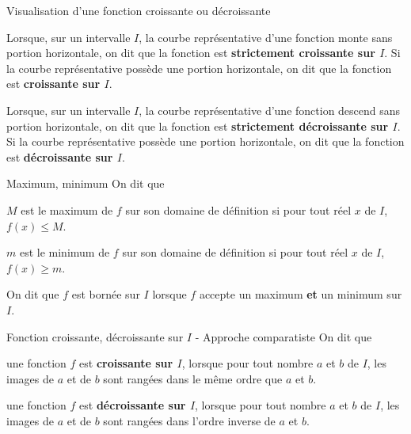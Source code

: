 \begin{DefT}{Visualisation d'une fonction croissante ou décroissante}
\begin{description}[leftmargin=*]
\item[•] Lorsque, sur un intervalle $I$, la courbe représentative d'une fonction monte sans portion horizontale, on dit que la fonction est \textbf{strictement croissante sur $I$}. Si la courbe représentative possède une portion horizontale, on dit que la fonction est \textbf{croissante sur $I$}.
\item[•] Lorsque, sur un intervalle $I$, la courbe représentative d'une fonction descend sans portion horizontale, on dit que la fonction est \textbf{strictement décroissante sur $I$}. Si la courbe représentative possède une portion horizontale, on dit que la fonction est \textbf{décroissante sur $I$}.
\end{description}
\end{DefT}




\begin{DefT}{Maximum, minimum}
On dit que
\begin{description}[leftmargin=*]
\item[•] $M$ est le maximum de $f$ sur son domaine de définition si pour tout réel $x$ de $I$, $f(x) \leq M$. 
\item[•] $m$ est le minimum de $f$ sur son domaine de définition si pour tout réel $x$ de $I$, $f(x) \geq m$. 
\end{description} 
On dit que $f$ est bornée  sur $I$ lorsque $f$ accepte un maximum \textbf{et} un minimum sur $I$.
\end{DefT}



\begin{DefT}{Fonction croissante, décroissante sur $I$ - Approche comparatiste}
On dit que
\begin{description}[leftmargin=*]
\item[•] une fonction $f$ est \textbf{croissante sur $I$}, lorsque pour tout nombre $a$ et $b$ de $I$, les images de $a$ et de $b$ sont rangées dans le même ordre que $a$ et $b$.
\item[•] une fonction $f$ est \textbf{décroissante sur $I$}, lorsque pour tout nombre $a$ et $b$ de $I$,  les images de $a$ et de $b$ sont rangées dans l'ordre inverse de $a$ et $b$.
\end{description} 
\end{DefT}

